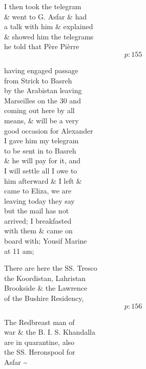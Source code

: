 \documentclass{report}
\begin{document}
	\par{
 	I then took the telegram\ \\\& went to G. Asfar \& had\ \\a talk with him \& explained\ \\\& showed him the telegrams\ \\he told that Père Pièrre\ \\
  \[p: 155 \]

	}


	\par{
 	having engaged passage\ \\from Strick to Basreh\ \\by the Arabistan leaving\ \\Marseilles on the 30 and\ \\coming out here by all\ \\means, \& will be a very\ \\good occasion for Alexander\ \\I gave him my telegram\ \\to be sent in to Basreh\ \\\& he will pay for it, and\ \\I will settle all I owe to\ \\him afterward \& I left \&\ \\came to Eliza, we are\ \\leaving today they say\ \\but the mail has not\ \\arrived; I breakfasted\ \\with them \& came on\ \\board with; Yousif Marine\ \\at 11 am;\ \\
	}

	\par{
 	There are here the SS. Tresco\ \\the Koordistan, Lahristan\ \\Brookside \& the Lawrence\ \\of the Bushire Residency,\ \\
  \[p: 156 \]

	}

	\par{
 	The Redbreast man of\ \\war \& the B. I. S. Khandalla\ \\are in quarantine, also\ \\the SS. Heronspool for\ \\Asfar \~{}\ \\
	}
\end{document}
